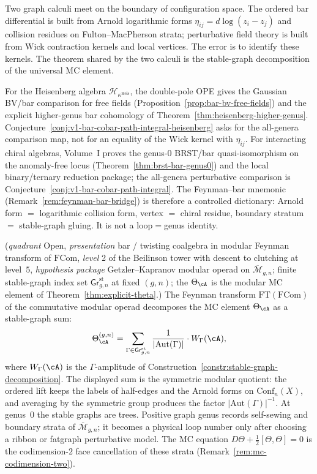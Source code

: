 
Two graph calculi meet on the boundary of configuration space.  The
ordered bar differential is built from Arnold logarithmic forms
$\eta_{ij}=d\log(z_i-z_j)$ and collision residues on
Fulton--MacPherson strata; perturbative field theory is built from
Wick contraction kernels and local vertices.  The error is to identify
these kernels.  The theorem shared by the two calculi is the
stable-graph decomposition of the universal MC element.

For the Heisenberg algebra $\mathcal{H}_{\kappa^{\mathrm{Heis}}}$,
the double-pole OPE gives the Gaussian BV/bar comparison for free
fields (Proposition~\ref{prop:bar-bv-free-fields}) and the explicit
higher-genus bar cohomology of Theorem~\ref{thm:heisenberg-higher-genus}.
Conjecture~\ref{conj:v1-bar-cobar-path-integral-heisenberg} asks for the
all-genera comparison map, not for an equality of the Wick kernel with
$\eta_{ij}$.  For interacting chiral algebras, Volume~I proves the
genus-$0$ BRST/bar quasi-isomorphism on the anomaly-free locus
(Theorem~\ref{thm:brst-bar-genus0}) and the local binary/ternary
reduction package; the all-genera perturbative comparison is
Conjecture~\ref{conj:v1-bar-cobar-path-integral}.  The
Feynman--bar mnemonic (Remark~\ref{rem:feynman-bar-bridge}) is therefore
a controlled dictionary: Arnold form $=$ logarithmic collision form,
vertex $=$ chiral residue, boundary stratum $=$ stable-graph gluing.
It is not a loop$=$genus identity.

\begin{construction}
\label{constr:feynman-stable-graph}
\textup{(}\emph{quadrant} Open, \emph{presentation} bar / twisting
coalgebra in modular Feynman transform of $\mathrm{FCom}$,
\emph{level} 2 of the Beilinson tower with descent to clutching at
level~$5$, \emph{hypothesis package} Getzler--Kapranov modular
operad on $\overline{\mathcal{M}}_{g,n}$; finite stable-graph index
set $\mathsf{Gr}^{\mathrm{st}}_{g,n}$ at fixed $(g, n)$; the
$\Theta_\cA$ is the modular MC element of
Theorem~\ref{thm:explicit-theta}.\textup{)}
The Feynman transform $\mathrm{FT}(\mathrm{FCom})$ of the commutative modular operad decomposes the MC element $\Theta_\cA$ as a stable-graph sum:
\[
\Theta_\cA^{(g,n)} = \sum_{\Gamma \in \mathsf{Gr}^{\mathrm{st}}_{g,n}} \frac{1}{|\mathrm{Aut}(\Gamma)|} \cdot W_\Gamma(\cA),
\]
where $W_\Gamma(\cA)$ is the $\Gamma$-amplitude of
Construction~\ref{constr:stable-graph-decomposition}.  The displayed
sum is the symmetric modular quotient: the ordered lift keeps the
labels of half-edges and the Arnold forms on
$\mathrm{Conf}_n(X)$, and averaging by the symmetric group produces
the factor $|\mathrm{Aut}(\Gamma)|^{-1}$.  At genus~$0$ the stable
graphs are trees.  Positive graph genus records self-sewing and
boundary strata of $\overline{\mathcal{M}}_{g,n}$; it becomes a
physical loop number only after choosing a ribbon or fatgraph
perturbative model.  The MC equation
$D\Theta+\tfrac{1}{2}[\Theta,\Theta]=0$ is the codimension-$2$ face
cancellation of these strata (Remark~\ref{rem:mc-codimension-two}).
\end{construction}

